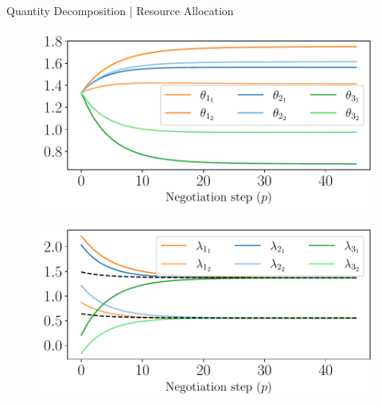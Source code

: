 \documentclass[aspectratio=169]{beamer}
\begin{document}
\begin{frame}{Quantity Decomposition | Resource Allocation}
  \centering
  \begin{minipage}{0.45\textwidth}
    \begin{figure}
      \includegraphics[width=\textwidth]{../img/example_primal_decomposition/example_theta.pdf}
    \end{figure}
  \end{minipage}
  \hfill
  \begin{minipage}{0.45\textwidth}
    \begin{figure}
      \centering
      \includegraphics[width=\textwidth]{../img/example_primal_decomposition/example_lambda.pdf}
    \end{figure}
  \end{minipage}
\end{frame}
\end{document}

